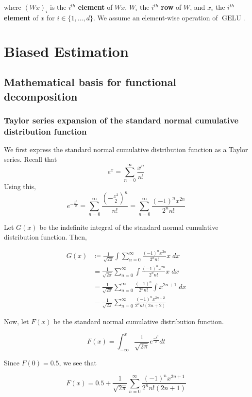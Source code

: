 \documentclass{article}
\begin{document}
where $(Wx)_i$ is the $i^{th}$ \textbf{element} of $Wx$, $W_i$ the $i^{th}$ \textbf{row} of $W$, and $x_i$ the $i^{th}$ \textbf{element} of $x$ for $i \in \{1,...,d\}$. We assume an element-wise operation of $\operatorname{GELU}$. 

\section{Biased Estimation}

\subsection{Mathematical basis for functional decomposition}


\subsubsection{Taylor series expansion of the standard normal cumulative distribution function}

We first express the standard normal cumulative distribution function as a Taylor series. Recall that 
$$
e^{x} = \sum_{n=0}^{\infty} \frac{x^n}{n!}
$$
Using this, 
$$
e^{-\frac{x^2}{2}} = \sum_{n=0}^{\infty} \frac{\left(-\frac{x^2}{2}\right)^n}{n!} = \sum_{n=0}^{\infty}\frac{(-1)^n x^{2n}}{2^n n!}
$$

Let $G(x)$ be the indefinite integral of the standard normal cumulative distribution function. Then, 

\begin{align*}
G(x) &\coloneqq \frac{1}{\sqrt{2\pi}}\int \sum_{n=0}^{\infty} \frac{(-1)^n x^{2n}}{2^n n!} x \; dx\\
&= \frac{1}{\sqrt{2\pi}} \sum_{n=0}^{\infty} \int \frac{(-1)^n x^{2n}}{2^n n!} x \; dx\\
&= \frac{1}{\sqrt{2\pi}} \sum_{n=0}^{\infty} \frac{(-1)^n}{2^n n!} \int x^{2n+1} \; dx\\
&= \frac{1}{\sqrt{2\pi}} \sum_{n=0}^{\infty} \frac{(-1)^n x^{2n+2}}{2^n n! (2n+2)}
\end{align*}

Now, let $F(x)$ be the standard normal cumulative distribution function. 

$$
F(x) = \int_{-\infty}^{x} \frac{1}{\sqrt{2\pi}} e^{\frac{-t^2}{2}} dt
$$

Since $F(0) = 0.5$, we see that

$$
F(x) = 0.5 + \frac{1}{\sqrt{2\pi}} \sum_{n=0}^{\infty} \frac{(-1)^n x^{2n+1}}{2^n n! (2n+1)}
$$
\end{document}
